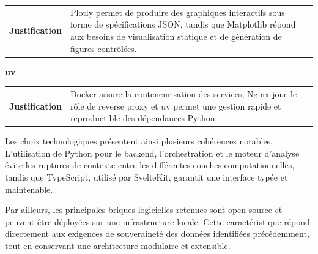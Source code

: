 \vspace{0.15cm}

\noindent
\begin{tabularx}{\textwidth}{@{}p{}X@{}}
\textcolor{MidGray}{\textbf{Justification}} &
Plotly permet de produire des graphiques interactifs sous forme
de spécifications JSON, tandis que Matplotlib répond aux besoins
de visualisation statique et de génération de figures contrôlées.
\end{tabularx}

\techseparator


\vspace{0.15cm}

\noindent
{}
\hspace{0.8cm}
\hspace{0.8cm}
{\bfseries\color{DarkSlate}uv}

\vspace{0.15cm}

\noindent
\begin{tabularx}{\textwidth}{@{}p{}X@{}}
\textcolor{MidGray}{\textbf{Justification}} &
Docker assure la conteneurisation des services, Nginx joue le rôle
de reverse proxy et uv permet une gestion rapide et reproductible
des dépendances Python.
\end{tabularx}

\vspace{0.5cm}


Les choix technologiques présentent ainsi plusieurs cohérences notables.
L'utilisation de Python pour le backend, l'orchestration et le moteur
d'analyse évite les ruptures de contexte entre les différentes couches
computationnelles, tandis que TypeScript, utilisé par SvelteKit, garantit
une interface typée et maintenable.

Par ailleurs, les principales briques logicielles retenues sont open
source et peuvent être déployées sur une infrastructure locale. Cette
caractéristique répond directement aux exigences de souveraineté des
données identifiées précédemment, tout en conservant une architecture
modulaire et extensible.
